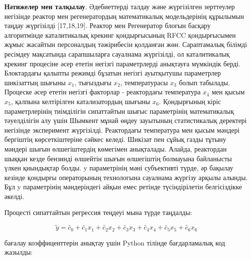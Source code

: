 \begin{multicols}{2}
{\bfseries Нәтижелер мен талқылау}. Әдебиеттерді талдау және жүргізілген
зерттеулер негізінде реактор мен регенератордың математикалық
модельдерінің құрылымын таңдау жүргізілді {[}17,18,19{]}. Реактор мен
Регенератор блогын басқару алгоритмінде каталитикалық крекинг
қондырғысының RFCC қондырғысымен жұмыс жасайтын персоналдың
тәжірибесін қолданған жөн.  Сараптамалық білімді ресімдеу мақсатында
сарапшыларға сауалнама жүргізілді, ол каталитикалық крекинг процесіне
әсер ететін негізгі параметрлерді анықтауға мүмкіндік
берді. Блоктардағы қалыпты режимді бұзатын негізгі ауытқытушы
параметрлер шикізаттың шығыны $x_1$, тығыздығы $x_2$, температурасы $x_3$ болып
табылады. Процеске әсер ететін негізгі факторлар - реактордағы
температура $x_4$ мен қысым $x_5$, қалпына келтірілген катализатордың шығыны
$x_6$. Қондырғының кіріс параметрлерінің тиімділігін сипаттайтын шығыс
параметрінің математикалық тәуелділігін алу үшін Шымкент мұнай өңдеу
зауытының статистикалық деректері негізінде эксперимент
жүргізілді. Реактордағы температура мен қысым мәндері бергіштің
көрсеткіштеріне сәйкес келеді. Шикізат пен сұйық газды тұтыну мәндері
шығын өлшегіштердің көмегімен анықталады. Алайда, реактордан шыққан
кезде бензинді өлшейтін шығын өлшегіштің болмауына байланысты үлкен
қиындықтар болды. y параметрінің мәні субъективті түрде, әр бақылау
кезінде қондырғы операторының технологына сауалнама жүргізу арқылы
алынды. Бұл y параметрінің мәндеріндегі айқын емес ретінде
түсіндірілетін белгісіздікке әкелді.

Процесті сипаттайтын регрессия теңдеуі мына түрде таңдалды:
\end{multicols}

\begin{equation}
\tilde{y}=\tilde{c_0}+\tilde{c_1}x_1+\tilde{c_2}x_2+\tilde{c_3}x_3+\tilde{c_4}x_4+\tilde{c_5}x_5+\tilde{c_6}x_6
\end{equation}

бағалау коэффиценттерін анықтау үшін Python тілінде бағдарламалық код жазылды:

